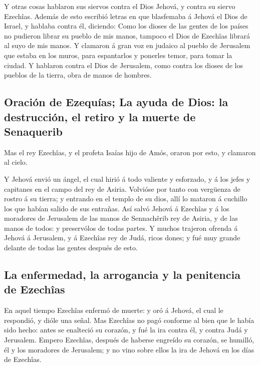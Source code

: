  Y otras cosas hablaron sus siervos contra el Dios
Jehová, y contra su siervo Ezechîas.  Además de esto
escribió letras en que blasfemaba á Jehová el Dios de Israel, y hablaba
contra él, diciendo: Como los dioses de las gentes de los países no
pudieron librar su pueblo de mis manos, tampoco el Dios de Ezechîas
librará al suyo de mis manos.  Y clamaron á gran voz en
judaico al pueblo de Jerusalem que estaba en los muros, para espantarlos
y ponerles temor, para tomar la ciudad.  Y hablaron
contra el Dios de Jerusalem, como contra los dioses de los pueblos de la
tierra, obra de manos de hombres.

\hypertarget{oraciuxf3n-de-ezequuxedas-la-ayuda-de-dios-la-destrucciuxf3n-el-retiro-y-la-muerte-de-senaquerib}{%
\subsection{Oración de Ezequías; La ayuda de Dios: la destrucción, el
retiro y la muerte de
Senaquerib}\label{oraciuxf3n-de-ezequuxedas-la-ayuda-de-dios-la-destrucciuxf3n-el-retiro-y-la-muerte-de-senaquerib}}

 Mas el rey Ezechîas, y el profeta Isaías hijo de Amós,
oraron por esto, y clamaron al cielo.

 Y Jehová envió un ángel, el cual hirió á todo valiente y
esforzado, y á los jefes y capitanes en el campo del rey de Asiria.
Volvióse por tanto con vergüenza de rostro á su tierra; y entrando en el
templo de su dios, allí lo mataron á cuchillo los que habían salido de
sus entrañas.  Así salvó Jehová á Ezechîas y á los
moradores de Jerusalem de las manos de Sennachêrib rey de Asiria, y de
las manos de todos: y preservólos de todas partes.  Y
muchos trajeron ofrenda á Jehová á Jerusalem, y á Ezechîas rey de Judá,
ricos dones; y fué muy grande delante de todas las gentes después de
esto.

\hypertarget{la-enfermedad-la-arrogancia-y-la-penitencia-de-ezechuxeeas}{%
\subsection{La enfermedad, la arrogancia y la penitencia de
Ezechîas}\label{la-enfermedad-la-arrogancia-y-la-penitencia-de-ezechuxeeas}}

 En aquel tiempo Ezechîas enfermó de muerte: y oró á
Jehová, el cual le respondió, y dióle una señal.  Mas
Ezechîas no pagó conforme al bien que le había sido hecho: antes se
enalteció su corazón, y fué la ira contra él, y contra Judá y Jerusalem.
 Empero Ezechîas, después de haberse engreído su corazón,
se humilló, él y los moradores de Jerusalem; y no vino sobre ellos la
ira de Jehová en los días de Ezechîas.

